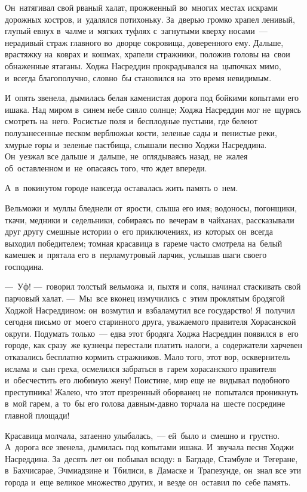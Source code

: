 \documentclass[12pt,a4paper]{book}
\begin{document}
Он~натягивал свой рваный халат, прожженный во~многих местах искрами дорожных костров, и~удалялся потихоньку. За~дверью громко храпел ленивый, глупый евнух в~чалме и~мягких туфлях с~загнутыми кверху носами~— нерадивый страж главного во~дворце сокровища, доверенного ему. Дальше, врастяжку на~коврах и~кошмах, храпели стражники, положив головы на~свои обнаженные ятаганы. Ходжа Насреддин прокрадывался на~цыпочках мимо, и~всегда благополучно, словно~бы становился на~это время невидимым.

И~опять звенела, дымилась белая каменистая дорога под бойкими копытами его ишака. Над миром в~синем небе сияло солнце; Ходжа Насреддин мог не~щурясь смотреть на~него. Росистые поля и~бесплодные пустыни, где белеют полузанесенные песком верблюжьи кости, зеленые сады и~пенистые реки, хмурые горы и~зеленые пастбища, слышали песню Ходжи Насреддина. Он~уезжал все дальше и~дальше, не~оглядываясь назад, не~жалея об~оставленном и~не~опасаясь того, что ждет впереди.

А~в~покинутом городе навсегда оставалась жить память о~нем.

Вельможи и~муллы бледнели от~ярости, слыша его имя; водоносы, погонщики, ткачи, медники и~седельники, собираясь по~вечерам в~чайханах, рассказывали друг другу смешные истории о~его приключениях, из~которых он~всегда выходил победителем; томная красавица в~гареме часто смотрела на~белый камешек и~прятала его в~перламутровый ларчик, услышав шаги своего господина.

—~Уф! —~говорил толстый вельможа~и, пыхтя и~сопя, начинал стаскивать свой парчовый халат. —~Мы~все вконец измучились с~этим проклятым бродягой Ходжой Насреддином: он~возмутил и~взбаламутил все государство! Я~получил сегодня письмо от~моего старинного друга, уважаемого правителя Хорасанской округи. Подумать только~— едва этот бродяга Ходжа Насреддин появился в~его городе, как сразу~же кузнецы перестали платить налоги, а~содержатели харчевен отказались бесплатно кормить стражников. Мало того, этот вор, осквернитель ислама и~сын греха, осмелился забраться в~гарем хорасанского правителя и~обесчестить его любимую жену! Поистине, мир еще не~видывал подобного преступника! Жалею, что этот презренный оборванец не~попытался проникнуть в~мой гарем, а~то~бы его голова давным-давно торчала на~шесте посредине главной площади!

Красавица молчала, затаенно улыбалась,~— ей~было и~смешно и~грустно. А~дорога все звенела, дымилась под копытами ишака. И~звучала песня Ходжи Насреддина. За~десять лет он~побывал всюду: в~Багдаде, Стамбуле и~Тегеране, в~Бахчисарае, Эчмиадзине и~Тбилиси, в~Дамаске и~Трапезунде, он~знал все эти города и~еще великое множество других, и~везде он~оставил по~себе память.
\end{document}
